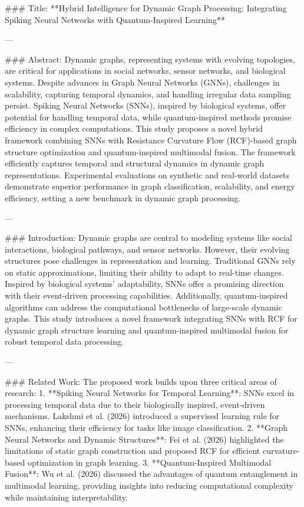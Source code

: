 ### Title:
**Hybrid Intelligence for Dynamic Graph Processing: Integrating Spiking Neural Networks with Quantum-Inspired Learning**

---

### Abstract:
Dynamic graphs, representing systems with evolving topologies, are critical for applications in social networks, sensor networks, and biological systems. Despite advances in Graph Neural Networks (GNNs), challenges in scalability, capturing temporal dynamics, and handling irregular data sampling persist. Spiking Neural Networks (SNNs), inspired by biological systems, offer potential for handling temporal data, while quantum-inspired methods promise efficiency in complex computations. This study proposes a novel hybrid framework combining SNNs with Resistance Curvature Flow (RCF)-based graph structure optimization and quantum-inspired multimodal fusion. The framework efficiently captures temporal and structural dynamics in dynamic graph representations. Experimental evaluations on synthetic and real-world datasets demonstrate superior performance in graph classification, scalability, and energy efficiency, setting a new benchmark in dynamic graph processing.

---

### Introduction:
Dynamic graphs are central to modeling systems like social interactions, biological pathways, and sensor networks. However, their evolving structures pose challenges in representation and learning. Traditional GNNs rely on static approximations, limiting their ability to adapt to real-time changes. Inspired by biological systems' adaptability, SNNs offer a promising direction with their event-driven processing capabilities. Additionally, quantum-inspired algorithms can address the computational bottlenecks of large-scale dynamic graphs. This study introduces a novel framework integrating SNNs with RCF for dynamic graph structure learning and quantum-inspired multimodal fusion for robust temporal data processing.

---

### Related Work:
The proposed work builds upon three critical areas of research:
1. **Spiking Neural Networks for Temporal Learning**: SNNs excel in processing temporal data due to their biologically inspired, event-driven mechanisms. Lakshmi et al. (2026) introduced a supervised learning rule for SNNs, enhancing their efficiency for tasks like image classification.
2. **Graph Neural Networks and Dynamic Structures**: Fei et al. (2026) highlighted the limitations of static graph construction and proposed RCF for efficient curvature-based optimization in graph learning.
3. **Quantum-Inspired Multimodal Fusion**: Wu et al. (2026) discussed the advantages of quantum entanglement in multimodal learning, providing insights into reducing computational complexity while maintaining interpretability.

